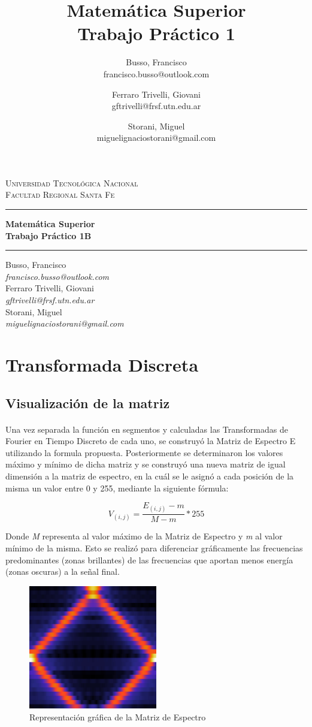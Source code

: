 \documentclass{article}
\title{Matemática Superior\\Trabajo Práctico 1}
\author{ Busso, Francisco\\francisco.busso@outlook.com 
    \and Ferraro Trivelli, Giovani\\gftrivelli@frsf.utn.edu.ar
    \and Storani, Miguel\\ miguelignaciostorani@gmail.com
}
\makeatletter
\renewcommand{\maketitle}{
    \begin{center}
        
        {\scshape{Universidad Tecnológica Nacional\\Facultad Regional Santa Fe}}
        \vspace{10pt}
        \hrule
        \vspace{10pt}
       

        {\LARGE\bfseries{Matemática Superior\\}}
        \vspace{5pt}
        {\Huge\bfseries{Trabajo Práctico 1B}}

        \vspace{8pt}
        \hrule
        \vspace{8pt}

        Busso, Francisco\\
        \textit{francisco.busso@outlook.com}\\
        \vspace{7pt}
        Ferraro Trivelli, Giovani\\
        \textit{gftrivelli@frsf.utn.edu.ar}\\
        \vspace{7pt}
        Storani, Miguel\\
        \textit{miguelignaciostorani@gmail.com}\\

        \thispagestyle{empty}
        
        \newpage
    \end{center}
}
\makeatother
\begin{document}
\maketitle
\newpage

\renewcommand{\contentsname}{Índice}
\tableofcontents
\newpage

    \section{Transformada Discreta}
	\subsection{Visualización de la matriz}

	        \paragraph{}
	        Una vez separada la función en segmentos y calculadas las Transformadas de Fourier en Tiempo Discreto de cada uno, 
	        se construyó la Matriz de Espectro E utilizando la formula propuesta. Posteriormente se determinaron los valores máximo y mínimo de dicha matriz 
	        y se construyó una nueva matriz de igual dimensión a la matriz de espectro, en la cuál se le asignó a cada posición de la misma un valor entre 0 y 255, 
	        mediante la siguiente fórmula:
	
	        \begin{equation}
	            V_{(i, j)}=\frac{E_{(i, j)}-m}{M-m}*255
	        \end{equation}
	
	        Donde \textit{M} representa al valor máximo de la Matriz de Espectro y \textit{m} al valor mínimo de la misma.
	        Esto se realizó para diferenciar gráficamente las frecuencias predominantes (zonas  brillantes) 
	        de las frecuencias que aportan menos energía (zonas oscuras) a la señal final.
	
	        \begin{figure}[h!]
	            \centering
	            \includegraphics[width=0.5\textwidth]{./Imagenes/Espectrogramas/estudiada.jpg}
	            \caption{Representación gráfica de la Matriz de Espectro}
	            \label{estudiada}
	        \end{figure}
	
\end{document}

